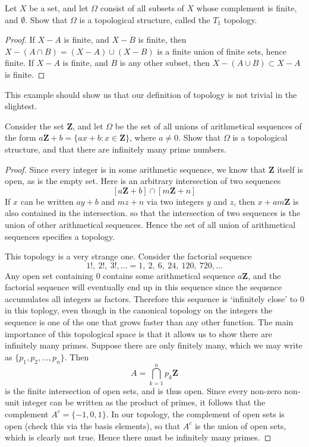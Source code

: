\begin{exercise}
    Let $X$ be a set, and let $\Omega$ consist of all subsets of $X$ whose complement is finite, and $\emptyset$. Show that $\Omega$ is a topological structure, called the $T_1$ topology.
\end{exercise}
\begin{proof}
    If $X - A$ is finite, and $X - B$ is finite, then $X - (A \cap B) = (X - A) \cup (X - B)$ is a finite union of finite sets, hence finite. If $X - A$ is finite, and $B$ is any other subset, then $X - (A \cup B) \subset X - A$ is finite.
\end{proof}

This example should show us that our definition of topology is not trivial in the slightest.

\begin{exercise}
    Consider the set $\mathbf{Z}$, and let $\Omega$ be the set of all unions of arithmetical sequences of the form $a\mathbf{Z} + b = \{ ax + b: x \in \mathbf{Z}\}$, where $a \neq 0$. Show that $\Omega$ is a topological structure, and that there are infinitely many prime numbers.
\end{exercise}
\begin{proof}
    Since every integer is in some arithmetic sequence, we know that $\mathbf{Z}$ itself is open, as is the empty set. Here is an arbitrary intersection of two sequences
    \[ [a\mathbf{Z} + b] \cap [m\mathbf{Z} + n] \]
    If $x$ can be written $ay + b$ and $mz + n$ via two integers $y$ and $z$, then $x + am\mathbf{Z}$ is also contained in the intersection. so that the intersection of two sequences is the union of other arithmetical sequences. Hence the set of all union of arithmetical sequences specifies a topology.

    This topology is a very strange one. Consider the factorial sequence
    \[ 1!,\ 2!,\ 3!, \dots = 1,\ 2,\ 6,\ 24,\ 120,\ 720, \dots \]
    Any open set containing $0$ contains some arithmetical sequence $a\mathbf{Z}$, and the factorial sequence will eventually end up in this sequence since the sequence accumulates all integers as factors. Therefore this sequence is `infinitely close' to 0 in this toplogy, even though in the canonical topology on the integers the sequence is one of the one that grows faster than any other function. The main importance of this topological space is that it allows us to show there are infinitely many primes. Suppose there are only finitely many, which we may write as $\{ p_1, p_2, \dots, p_n \}$. Then
    \[ A = \bigcap_{k = 1}^n p_k\mathbf{Z} \]
    is the finite intersection of open sets, and is thus open. Since every non-zero non-unit integer can be written as the product of primes, it follows that the complement $A^c = \{ -1,0,1 \}$. In our topology, the complement of open sets is open (check this via the basis elements), so that $A^c$ is the union of open sets, which is clearly not true. Hence there must be infinitely many primes.
\end{proof}

